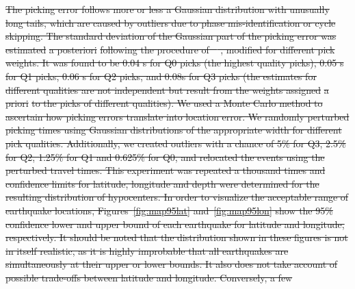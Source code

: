 \documentclass[jgrga]{agu2001} %
\newlength{\tw}
\providecommand{\DIFdel}[1]{{\protect\color{red}\sout{#1}}}                      %
\begin{document}
\begin{article}
\DIFdel{The picking error follows more or less a Gaussian distribution with
unusually long tails, which are caused by outliers due to phase mis-identification
or cycle skipping.   The standard deviation of the Gaussian
part of the picking
error was estimated }%
\DIFdel{a posteriori}%
\DIFdel{following the procedure of \mbox{%
\citet{wilcock91}}%
,
modified for different pick weights.  It was found to be 0.04 s for
Q0 picks (the highest quality picks), 0.05 s for Q1 picks, 0.06 s for Q2 picks, and 0.08s
for Q3 picks (the estimates for different qualities are not
independent but result from the weights assigned }%
\DIFdel{a priori}%
\DIFdel{to the
picks of different qualities). We  used a Monte Carlo method to ascertain how picking errors
translate into location error. We randomly perturbed picking times
using Gaussian distributions of the appropriate width for different pick
qualities.  Additionally, we created outliers with
a chance of 5\% for Q3, 2.5\% for Q2, 1.25\% for Q1 and 0.625\% for
Q0, and relocated the events using the perturbed travel times. This
experiment was repeated a thousand times and confidence limits for
latitude, longitude and depth were determined for the resulting distribution of
hypocenters.  
 In order to visualize the acceptable range
of earthquake locations, Figures~\ref{fig:map95lat}
and~\ref{fig:map95lon} show the 95\% confidence lower and upper bound of each
earthquake for latitude and longitude, respectively. It should be
noted that the distribution shown in these figures is not in itself realistic, as it is
highly improbable that all earthquakes are simultaneously at their
upper or lower bounds. It also does not take account of possible
trade-offs between latitude and longitude.  Conversely, a few
}
\end{article}
\end{document}
